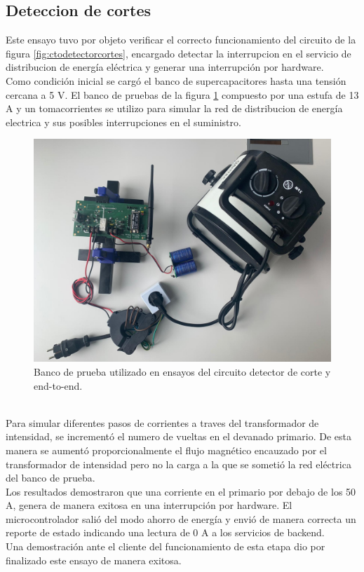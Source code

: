 \vspace{200px}
\subsection{Deteccion de cortes}
Este ensayo tuvo por objeto verificar el correcto funcionamiento del circuito de la figura \ref{fig:ctodetectorcortes}, encargado detectar la interrupcion en el servicio de distribucion de energía el\'{e}ctrica y generar una interrupci\'{o}n por hardware.\\
Como condici\'{o}n inicial se carg\'{o} el banco de supercapacitores hasta una tensión cercana a 5 V. 
El banco de pruebas de la figura \ref{fig:bancopruebae2e2} compuesto por una estufa de 13 A y un tomacorrientes se utilizo para simular la red de distribucion de energía electrica y sus posibles interrupciones en el suministro.\\
\begin{figure}[h]
	\centering
	\includegraphics[width=1.0\linewidth]{Figures/banco_prueba_e2e_1}
	\caption{Banco de prueba utilizado en ensayos del circuito detector de corte y end-to-end.}
	\label{fig:bancopruebae2e2}
\end{figure}\\
Para simular diferentes pasos de corrientes a traves del transformador de intensidad, se increment\'{o} el numero de vueltas en el devanado primario. De esta manera se aument\'{o} proporcionalmente el flujo magn\'{e}tico encauzado por el transformador de intensidad pero no la carga a la que se someti\'{o} la red el\'{e}ctrica del banco de prueba.\\
Los resultados demostraron que una corriente en el primario por debajo de los 50 A, genera de manera exitosa en una interrupci\'{o}n por hardware. El microcontrolador sali\'{o} del modo ahorro de energía y envi\'{o} de manera correcta un reporte de estado indicando una lectura de 0 A a los servicios de backend.\\
Una demostraci\'{o}n ante el cliente del funcionamiento de esta etapa dio por finalizado este ensayo de manera exitosa.\\


